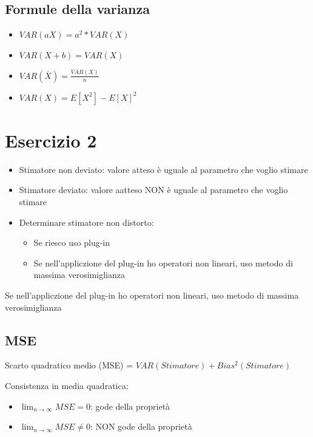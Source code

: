\documentclass{article}
\begin{document}
\subsection*{Formule della varianza}

\begin{itemize}
    \item $VAR(aX) = a^2* VAR(X)$
    \item $VAR(X + b) = VAR(X)$
    \item $VAR(\overline {X}) = \frac{VAR(X)}{n}$
    \item $VAR(X) = E[X^2] - E[X]^2$
\end{itemize}

\section{Esercizio 2}

\begin{itemize}
    \item Stimatore non deviato: valore atteso è uguale al parametro che voglio stimare
    \item Stimatore deviato: valore aatteso NON è uguale al parametro che voglio stimare
    \item Determinare stimatore non distorto:
    \begin{itemize}
        \item Se riesco uso plug-in 
        \item Se nell'appliczione del plug-in ho operatori non lineari, uso metodo di massima verosimiglianza
    \end{itemize}
\end{itemize}

Se nell'appliczione del plug-in ho operatori non lineari, uso metodo di massima verosimiglianza

\subsection*{MSE}

Scarto quadratico medio (MSE) = $VAR(Stimatore) + Bias^2(Stimatore)$

Consistenza in media quadratica:

\begin{itemize}
    \item $\lim_{n \to \infty}MSE = 0$: gode della proprietà
    \item $\lim_{n \to \infty}MSE \neq 0$: NON gode della proprietà
\end{itemize}
\end{document}
